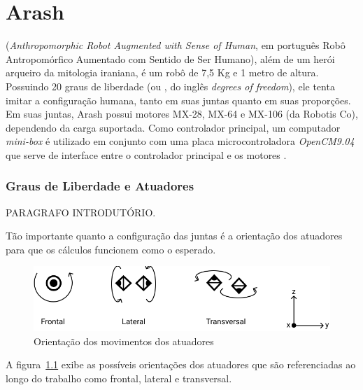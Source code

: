 \chapter{Arash}

(\textit{Anthropomorphic Robot Augmented with Sense of Human}, em português Robô Antropomórfico Aumentado com Sentido de Ser Humano), além de um herói arqueiro da mitologia iraniana, é um robô de 7,5 Kg e 1 metro de altura. Possuindo 20 graus de liberdade (ou , do inglês \textit{degrees of freedom}), ele tenta imitar a configuração humana, tanto em suas juntas quanto em suas proporções. Em suas juntas, Arash possui motores MX-28, MX-64 e MX-106 (da Robotis Co), dependendo da carga suportada. Como controlador principal, um computador \textit{mini-box} é utilizado em conjunto com uma placa microcontroladora \textit{OpenCM9.04} que serve de interface entre o controlador principal e os motores \cite{autdp2016}.

\subsection{Graus de Liberdade e Atuadores}
\label{subsec:architecture:Atuators}

PARAGRAFO INTRODUTÓRIO.

Tão importante quanto a configuração das juntas é a orientação dos atuadores para que os cálculos funcionem como o esperado.

\begin{figure}[htb]
	\centering
	\includegraphics[scale=1]{imagens/svg/actuators-orientation}
	\caption{Orientação dos movimentos dos atuadores}
	\label{fig:ActuatorsOrientation}
\end{figure}

A figura~\ref{fig:ActuatorsOrientation} exibe as possíveis orientações dos atuadores que são referenciadas ao longo do trabalho como frontal, lateral e transversal.

